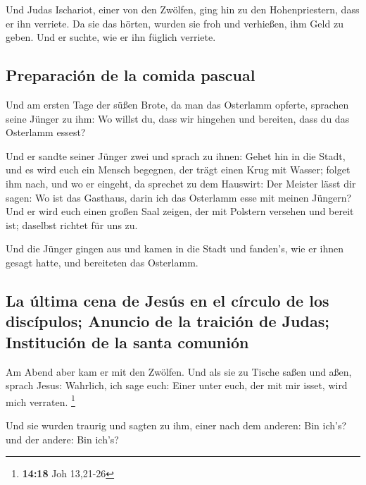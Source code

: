  Und Judas Ischariot, einer von den Zwölfen, ging hin zu
den Hohenpriestern, dass er ihn verriete.  Da sie das
hörten, wurden sie froh und verhießen, ihm Geld zu geben. Und er suchte,
wie er ihn füglich verriete.

\hypertarget{preparaciuxf3n-de-la-comida-pascual}{%
\subsection{Preparación de la comida
pascual}\label{preparaciuxf3n-de-la-comida-pascual}}

 Und am ersten Tage der süßen Brote, da man das Osterlamm
opferte, sprachen seine Jünger zu ihm: Wo willst du, dass wir hingehen
und bereiten, dass du das Osterlamm essest?

 Und er sandte seiner Jünger zwei und sprach zu ihnen:
Gehet hin in die Stadt, und es wird euch ein Mensch begegnen, der trägt
einen Krug mit Wasser; folget ihm nach,  und wo er
eingeht, da sprechet zu dem Hauswirt: Der Meister lässt dir sagen: Wo
ist das Gasthaus, darin ich das Osterlamm esse mit meinen Jüngern?
 Und er wird euch einen großen Saal zeigen, der mit
Polstern versehen und bereit ist; daselbst richtet für uns zu.

 Und die Jünger gingen aus und kamen in die Stadt und
fanden's, wie er ihnen gesagt hatte, und bereiteten das Osterlamm.

\hypertarget{la-uxfaltima-cena-de-jesuxfas-en-el-cuxedrculo-de-los-discuxedpulos-anuncio-de-la-traiciuxf3n-de-judas-instituciuxf3n-de-la-santa-comuniuxf3n}{%
\subsection{La última cena de Jesús en el círculo de los discípulos;
Anuncio de la traición de Judas; Institución de la santa
comunión}\label{la-uxfaltima-cena-de-jesuxfas-en-el-cuxedrculo-de-los-discuxedpulos-anuncio-de-la-traiciuxf3n-de-judas-instituciuxf3n-de-la-santa-comuniuxf3n}}

 Am Abend aber kam er mit den Zwölfen. 
Und als sie zu Tische saßen und aßen, sprach Jesus: Wahrlich, ich sage
euch: Einer unter euch, der mit mir isset, wird mich verraten.
\footnote{\textbf{14:18} Joh 13,21-26}

 Und sie wurden traurig und sagten zu ihm, einer nach dem
anderen: Bin ich's? und der andere: Bin ich's?

